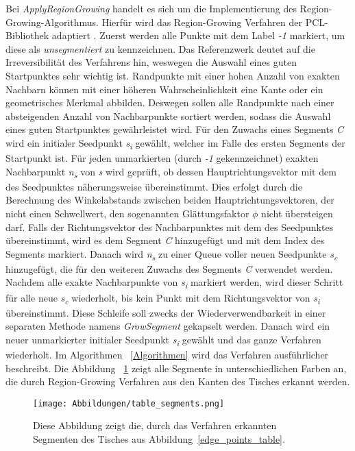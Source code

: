 Bei \textit{ApplyRegionGrowing} handelt es sich um die Implementierung des Region-Growing-Algorithmus. Hierfür wird das Region-Growing Verfahren der PCL-Bibliothek adaptiert \autocite{rusu_3d_2011}. Zuerst werden alle Punkte mit dem Label \textit{-1} markiert, um diese als \textit{unsegmentiert} zu kennzeichnen. Das Referenzwerk deutet auf die Irreversibilität des Verfahrens hin, weswegen die Auswahl eines guten Startpunktes sehr wichtig ist. Randpunkte mit einer hohen Anzahl von exakten Nachbarn können mit einer höheren Wahrscheinlichkeit eine Kante oder ein geometrisches Merkmal abbilden. Deswegen sollen alle Randpunkte nach einer absteigenden Anzahl von Nachbarpunkte sortiert werden, sodass die Auswahl eines guten Startpunktes gewährleistet wird. Für den Zuwachs eines Segments \textit{C} wird ein initialer Seedpunkt \textit{s\textsubscript{i}} gewählt, welcher im Falle des ersten Segments der Startpunkt ist. Für jeden unmarkierten (durch \textit{-1} gekennzeichnet) exakten Nachbarpunkt \textit{n\textsubscript{s}} von \textit{s} wird geprüft, ob dessen Hauptrichtungsvektor mit dem des Seedpunktes näherungsweise übereinstimmt. Dies erfolgt durch die Berechnung des Winkelabstands zwischen beiden Hauptrichtungsvektoren, der nicht einen Schwellwert, den sogenannten Glättungsfaktor $\phi$ nicht übersteigen darf. Falls der Richtungsvektor des Nachbarpunktes mit dem des Seedpunktes übereinstimmt, wird es dem Segment \textit{C} hinzugefügt und mit dem Index des Segments markiert. Danach wird \textit{n\textsubscript{s}} zu einer Queue voller neuen Seedpunkte \textit{s\textsubscript{c}} hinzugefügt, die für den weiteren Zuwachs des Segments \textit{C} verwendet werden. Nachdem alle exakte Nachbarpunkte von \textit{s\textsubscript{i}} markiert werden, wird dieser Schritt für alle neue \textit{s\textsubscript{c}} wiederholt, bis kein Punkt mit dem Richtungsvektor von \textit{s\textsubscript{i}} übereinstimmt. Diese Schleife soll zwecks der Wiederverwendbarkeit in einer separaten Methode namens \textit{GrowSegment} gekapselt werden. Danach wird ein neuer unmarkierter initialer Seedpunkt \textit{s\textsubscript{i}} gewählt und das ganze Verfahren wiederholt. Im Algorithmen ~\ref{Algorithmen} wird das Verfahren ausführlicher beschreibt. Die Abbildung ~\ref{segments_table} zeigt alle Segmente in unterschiedlichen Farben an, die durch Region-Growing Verfahren aus den Kanten des Tisches erkannt werden.

\begin{figure}[h]
	\texttt{[image: Abbildungen/table\_segments.png]}
	\centering
	\caption{Diese Abbildung zeigt die, durch das Verfahren erkannten  Segmenten des Tisches aus Abbildung~\ref{edge_points_table}.}
	\label{segments_table}
\end{figure}

